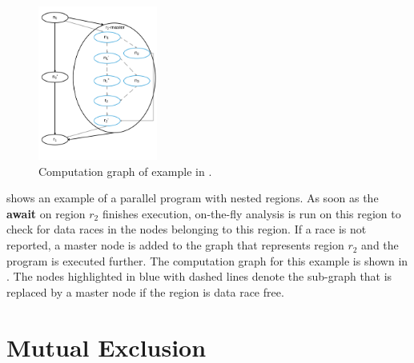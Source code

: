 \begin{figure}
  \centering
   \includegraphics[width=0.35\textwidth]{../figs/Fig11.pdf}
   \vspace{-1em}
  \caption{Computation graph of example in .}
        \vspace{-1em}
   \label{fig:cg-nested-regions}
\end{figure}

 shows an example of a parallel program with nested regions. As soon as the \textbf{await} on region $r_2$ finishes execution, on-the-fly analysis is run on this region to check for data races in the nodes belonging to this region. If a race is not reported, a master node is added to the graph that represents region $r_2$ and the program is executed further. The computation graph for this example is shown in . The nodes highlighted in blue with dashed lines denote the sub-graph that is replaced by a master node if the region is data race free.

\section{Mutual Exclusion}

